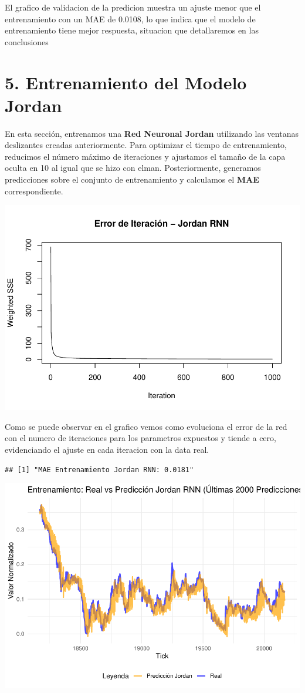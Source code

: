 \documentclass[
]{book}
\begin{document}
El grafico de validacion de la predicion muestra un ajuste menor que el entrenamiento con un MAE de 0.0108, lo que indica que el modelo de entrenamiento tiene mejor respuesta, situacion que detallaremos en las conclusiones

\section{5. Entrenamiento del Modelo Jordan}\label{entrenamiento-del-modelo-jordan}

En esta sección, entrenamos una \textbf{Red Neuronal Jordan} utilizando las ventanas deslizantes creadas anteriormente. Para optimizar el tiempo de entrenamiento, reducimos el número máximo de iteraciones y ajustamos el tamaño de la capa oculta en 10 al igual que se hizo con elman. Posteriormente, generamos predicciones sobre el conjunto de entrenamiento y calculamos el \textbf{MAE} correspondiente.

\includegraphics{bookdown_time_series_files/figure-latex/rnn-6-1.pdf}

Como se puede observar en el grafico vemos como evoluciona el error de la red con el numero de iteraciones para los parametros expuestos y tiende a cero, evidenciando el ajuste en cada iteracion con la data real.

\begin{verbatim}
## [1] "MAE Entrenamiento Jordan RNN: 0.0181"
\end{verbatim}

\includegraphics{bookdown_time_series_files/figure-latex/rnn-7-1.pdf}
\end{document}
